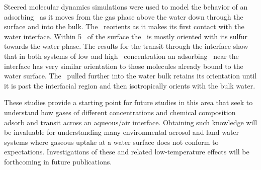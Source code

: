 \documentclass{article}
\begin{document}
Steered molecular dynamics simulations were used to model the behavior of an adsorbing \suldiox~as it moves from the gas phase above the water down through the surface and into the bulk. The \suldiox~reorients as it makes its first contact with the water interface. Within 5 \angs~of the surface the \suldiox~is mostly oriented with its sulfur towards the water phase. The results for the transit through the interface show that in both systems of low and high \suldiox~concentration an adsorbing \suldiox~near the interface has very similar orientation to those molecules already bound to the water surface. The \suldiox~pulled further into the water bulk retains its orientation until it is past the interfacial region and then isotropically orients with the bulk water.

These studies provide a starting point for future studies in this area that seek to understand how gases of different concentrations and chemical composition adsorb and transit across an aqueous/air interface. Obtaining such knowledge will be invaluable for understanding many environmental aerosol and land water systems where gaseous uptake at a water surface does not conform to expectations.\cite{Jayne1990,Yang2002,Worsnop1989,Boniface2000} Investigations of these and related low-temperature effects will be forthcoming in future publications.



\end{document}
